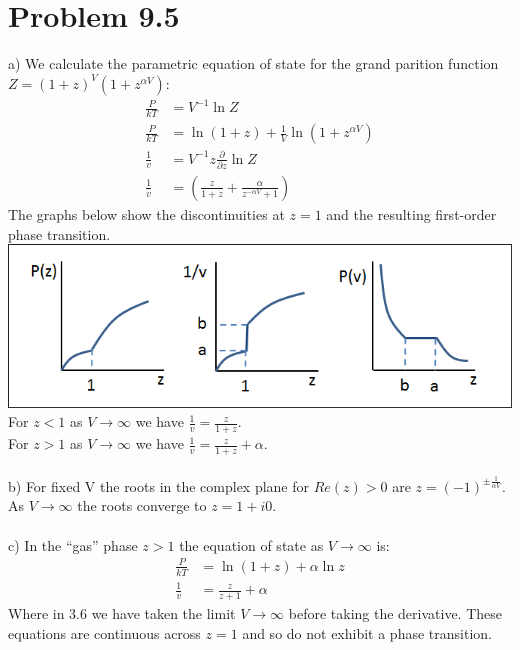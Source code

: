 \documentclass[a4paper,11pt]{article}
\numberwithin{equation}{section}
\begin{document}
\section{Problem 9.5}
a) We calculate the parametric equation of state for the grand parition function $Z=(1+z)^V(1+z^{\alpha V}) $:
\begin{align}
 \frac{P}{kT} &= V^{-1}\ln{Z}\\
 \frac{P}{kT} &= \ln{(1+z)}+\frac{1}{V}\ln{(1+z^{\alpha V})}\\
 \frac{1}{v}  &= V^{-1}z\frac{\partial}{\partial z}\ln{Z}\\
 \frac{1}{v}  &= \left(\frac{z}{1+z}+\frac{\alpha}{z^{-\alpha V}+1} \right)
\end{align}
The graphs below show the discontinuities at $z=1$ and the resulting first-order phase transition.
\\
\includegraphics{statmech_p9_5}
\\ 
For $z<1$ as $V \rightarrow \infty$ we have $\frac{1}{v}=\frac{z}{1+z}$.\\
For $z>1$ as $V \rightarrow \infty$ we have $\frac{1}{v}=\frac{z}{1+z}+\alpha$.
\\ \\
b) For fixed V the roots in the complex plane for $Re(z)>0$ are $z=(-1)^{\pm\frac{1}{\alpha V}} $.
As $V \rightarrow \infty$ the roots converge to $z=1+i0$.
\\ \\
c) In the ``gas'' phase $z>1$  the equation of state as $V \rightarrow \infty$ is:
\begin{align}
 \frac{P}{kT} &= \ln{(1+z)}+\alpha \ln{z}\\
 \frac{1}{v}  &= \frac{z}{z+1}+\alpha
\end{align}
Where in 3.6 we have taken the limit $V \rightarrow \infty$ before taking the derivative.
These equations are continuous across $z=1$ and so do not exhibit a phase transition.
\end{document}
